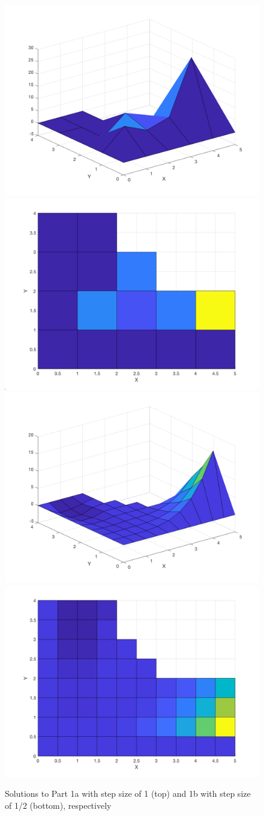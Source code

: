 \documentclass[10pt,a4paper]{article}
\begin{document}
\begin{figure}[H]
\includegraphics[width=0.5\linewidth]{figures/part1aside.png}
\includegraphics[width=0.5\linewidth]{figures/part1atop.png}
\includegraphics[width=0.5\linewidth]{figures/part1bside.png}
\includegraphics[width=0.5\linewidth]{figures/part1btop.png}
\caption{Solutions to Part 1a with step size of 1 (top) and 1b with step size of 1/2 (bottom), respectively}
\label{fig: steps}
\end{figure}
\end{document}
